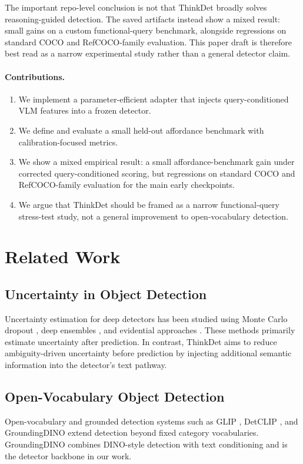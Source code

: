 \documentclass{uai2026} %
\begin{document}
The important repo-level conclusion is not that ThinkDet broadly solves
reasoning-guided detection. The saved artifacts instead show a mixed result:
small gains on a custom functional-query benchmark, alongside regressions on
standard COCO and RefCOCO-family evaluation. This paper draft is therefore
best read as a narrow experimental study rather than a general detector claim.

\paragraph{Contributions.}
\begin{enumerate}
\item We implement a parameter-efficient adapter that injects query-conditioned VLM features into a frozen detector.
\item We define and evaluate a small held-out affordance benchmark with calibration-focused metrics.
\item We show a mixed empirical result: a small affordance-benchmark gain under corrected query-conditioned scoring, but regressions on standard COCO and RefCOCO-family evaluation for the main early checkpoints.
\item We argue that ThinkDet should be framed as a narrow functional-query stress-test study, not a general improvement to open-vocabulary detection.
\end{enumerate}

\section{Related Work}\label{sec:related}
\subsection{Uncertainty in Object Detection}
Uncertainty estimation for deep detectors has been studied using Monte Carlo dropout \citep{gal2016dropout}, deep ensembles \citep{lakshminarayanan2017deep}, and evidential approaches \citep{sensoy2018evidential}. These methods primarily estimate uncertainty after prediction. In contrast, ThinkDet aims to reduce ambiguity-driven uncertainty before prediction by injecting additional semantic information into the detector's text pathway.

\subsection{Open-Vocabulary Object Detection}
Open-vocabulary and grounded detection systems such as GLIP \citep{glip2022}, DetCLIP \citep{detclip2022}, and GroundingDINO \citep{groundingdino2023} extend detection beyond fixed category vocabularies. GroundingDINO combines DINO-style detection \citep{dino2023} with text conditioning and is the detector backbone in our work.
\end{document}
